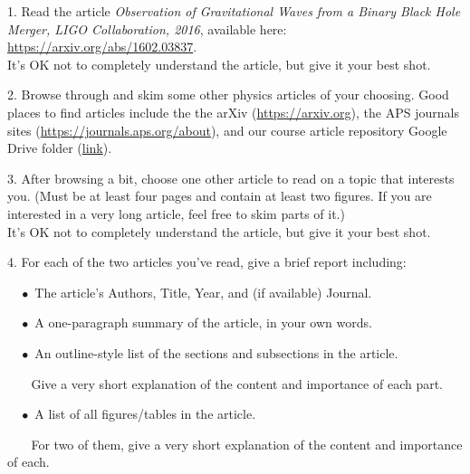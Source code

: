 \documentclass[12pt]{article}
\newcommand{\qspace}{\vskip15pt}
\begin{document}
1. Read the article \textit{Observation of Gravitational Waves from a Binary Black Hole Merger, LIGO Collaboration, 2016}, available here: \url{https://arxiv.org/abs/1602.03837}. \\
It's OK not to completely understand the article, but give it your best shot.

\qspace

2. Browse through and skim some other physics articles of your choosing. Good places to find articles include the the arXiv (\url{https://arxiv.org}), the APS journals sites (\url{https://journals.aps.org/about}), and our course article repository Google Drive folder (\href{https://drive.google.com/open?id=1Dozq9Of8CIdrI0FArCtk6bdCjGIkfbbB}{link}).


\qspace

3. After browsing a bit, choose one other article to read on a topic that interests you. (Must be at least four pages and contain at least two figures. If you are interested in a very long article, feel free to skim parts of it.) \\
It's OK not to completely understand the article, but give it your best shot.


\qspace

4. For each of the two articles you've read, give a brief report including:

$\quad \bullet$ The article's Authors, Title, Year, and (if available) Journal.

$\quad \bullet$ A one-paragraph summary of the article, in your own words.

$\quad \bullet$ An outline-style list of the sections and subsections in the article.

$\quad \;\;$ Give a very short explanation of the content and importance of each part.

$\quad \bullet$ A list of all figures/tables in the article. 

$\quad \;\;$ For two of them, give a very short explanation of the content and importance of each.
\end{document}
